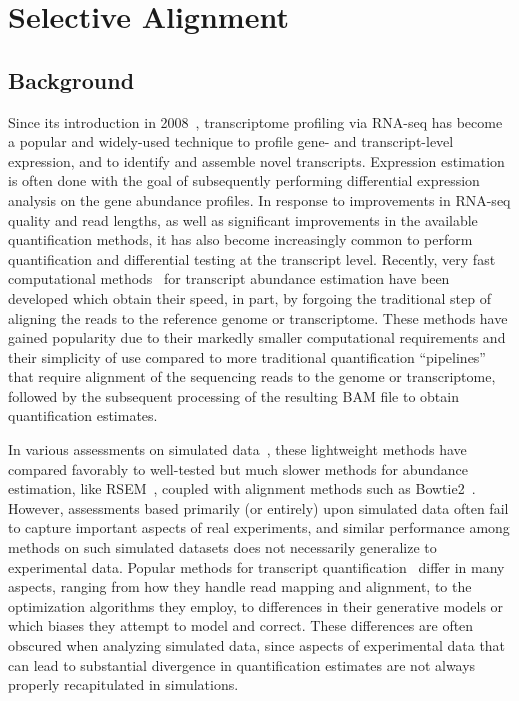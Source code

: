 
\chapter{Selective Alignment} %

\label{selective_alignment} %


\section{Background}
\label{sec:background}

Since its introduction in 2008~\citep{lister,nagalakshmi,mortazavi2008mapping}, transcriptome
profiling via RNA-seq has become a popular and widely-used technique to profile gene-
and transcript-level expression, and to identify and assemble novel transcripts.
Expression estimation is often done with the goal of subsequently performing
differential expression analysis on the gene abundance profiles. In response to
improvements in RNA-seq quality and read lengths, as well as significant
improvements in the available quantification methods, it has also become
increasingly common to perform quantification and differential testing at the
transcript level. Recently, very
fast computational methods~\citep{sailfish,kallisto,salmon,fleximer} for
transcript abundance estimation have been developed which obtain their speed, in part, by forgoing
the traditional step of aligning the reads to the reference genome
or transcriptome. These methods have gained popularity due to their markedly
smaller computational requirements and their simplicity of use compared to more
traditional quantification ``pipelines'' that require alignment of the
sequencing reads to the genome or transcriptome, followed by the subsequent
processing of the resulting BAM file to obtain quantification estimates.

In various assessments on simulated data~\citep{kanitz2015comparative,germain2016rnaonthebench,zhang2017evaluation}, these lightweight 
methods have compared favorably to well-tested but much slower methods for
abundance estimation, like RSEM~\citep{li2011rsem}, coupled with alignment methods such
as Bowtie2~\citep{bowtie2}. However, assessments based primarily (or entirely)
upon simulated data often fail to capture important aspects of real experiments,
and similar performance among methods on such simulated datasets does not
necessarily generalize to experimental data. Popular methods for transcript
quantification~\citep{rnaskim,fleximer,salmon,kallisto,sailfish,li2011rsem,heraem,hensman2015fast,glaus2012identifying}
differ in many aspects, ranging from how they handle read mapping and alignment,
to the optimization algorithms they employ, to differences in their
generative models or which biases they attempt to model and correct. These differences
are often obscured when analyzing simulated data, since aspects of experimental
data that can lead to substantial divergence in quantification estimates are not
always properly recapitulated in simulations.


